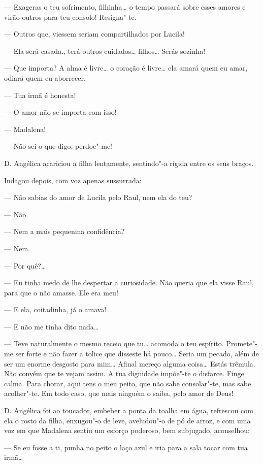 --- Exageras o teu sofrimento, filhinha\ldots{} o tempo passará sobre esses
amores e virão outros para teu consolo! Resigna"-te.

--- Outros que, viessem seriam compartilhados por Lucila!

--- Ela será casada., terá outros cuidados\ldots{} filhos\ldots{} Serás sozinha!

--- Que importa? A alma é livre\ldots{} o coração é livre\ldots{} ela amará quem
eu amar, odiará quem eu aborrecer.

--- Tua irmã é honesta!

--- O amor não se importa com isso!

--- Madalena!

--- Não sei o que digo, perdoe"-me!

D. Angélica acariciou a filha lentamente, sentindo"-a rígida entre os
seus braços.

Indagou depois, com voz apenas sussurrada:

--- Não sabias do amor de Lucila pelo Raul, nem ela do teu?

--- Não.

--- Nem a mais pequenina confidência?

--- Nem.

--- Por quê?\ldots{}

--- Eu tinha medo de lhe despertar a curiosidade. Não queria que ela
visse Raul, para que o não amasse. Ele era meu!

--- E ela, coitadinha, já o amava!

--- E não me tinha dito nada\ldots{}

--- Teve naturalmente o mesmo receio que tu\ldots{} acomoda o teu espírito.
Promete"-me ser forte e não fazer a tolice que disseste há pouco\ldots{} Seria
um pecado, além de ser um enorme desgosto para mim\ldots{} Afinal mereço
alguma coisa\ldots{} Estás trêmula. Não convém que te vejam assim. A tua
dignidade impõe"-te o disfarce. Finge calma. Para chorar, aqui tens o meu
peito, que não sabe consolar"-te, mas sabe acolher"-te. Em todo caso, que
mais ninguém o saiba, pelo amor de Deus!

D. Angélica foi ao toucador, embeber a ponta da toalha em água,
refrescou com ela o rosto da filha, enxugou"-o de leve, aveludou"-o de pó
de arroz, e com uma voz em que Madalena sentiu um esforço poderoso, bem
subjugado, aconselhou:

--- Se eu fosse a ti, punha no peito o laço azul e iria para a sala
tocar com tua irmã\ldots{}

